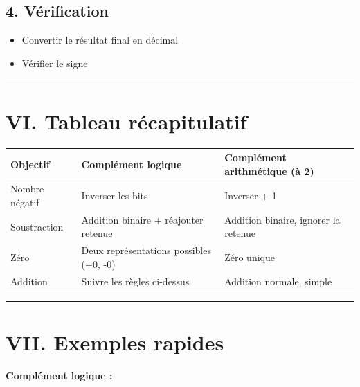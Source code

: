 \documentclass[a4paper,12pt]{article}
\begin{document}
  

\subsection*{4. Vérification} 

\begin{itemize} 

    \item Convertir le résultat final en décimal 

    \item Vérifier le signe 

\end{itemize} 

  

\hrule
\section*{VI. Tableau récapitulatif} 

  

\begin{tabular}{|>{\centering\arraybackslash}m{5cm}|>{\centering\arraybackslash}m{5cm}|>{\centering\arraybackslash}m{5cm}|} 

\hline 

\textbf{Objectif} & \textbf{Complément logique} & \textbf{Complément arithmétique (à 2)} \\ \hline 

Nombre négatif & Inverser les bits & Inverser + 1 \\ \hline 

Soustraction & Addition binaire + réajouter retenue & Addition binaire, ignorer la retenue \\ \hline 

Zéro & Deux représentations possibles (+0, -0) & Zéro unique \\ \hline 

Addition & Suivre les règles ci-dessus & Addition normale, simple \\ \hline 

\end{tabular} 

  

\hrule
\section*{VII. Exemples rapides} 

  

\textbf{Complément logique :}   
\end{document}
